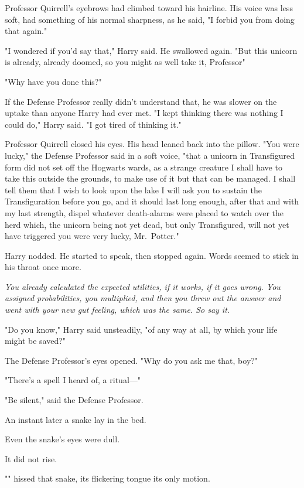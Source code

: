 Professor Quirrell's eyebrows had climbed toward his hairline. His voice was
less soft, had something of his normal sharpness, as he said, "I forbid you
from doing that again."

"I wondered if you'd say that," Harry said. He swallowed again. "But this
unicorn is already, already doomed, so you might as well take it,
Professor{\el}"

"Why have you done this?"

If the Defense Professor really didn't understand that, he was slower on the
uptake than anyone Harry had ever met. "I kept thinking there was nothing I
could do," Harry said. "I got tired of thinking it."

Professor Quirrell closed his eyes. His head leaned back into the pillow. "You
were lucky," the Defense Professor said in a soft voice, "that a unicorn in
Transfigured form{\el} did not set off the Hogwarts wards, as a strange
creature{\el} I shall have to{\el} take this outside the grounds, to make
use of it{\el} but that can be managed. I shall tell them that I wish to
look upon the lake{\el} I will ask you to sustain the Transfiguration before
you go, and it should last long enough, after that{\el} and with my last
strength, dispel whatever death-alarms were placed to watch over the
herd{\el} which, the unicorn being not yet dead, but only Transfigured, will
not yet have triggered{\el} you were very lucky, Mr.~Potter."

Harry nodded. He started to speak, then stopped again. Words seemed to stick in
his throat once more.

\emph{You already calculated the expected utilities, if it works, if it goes
wrong. You assigned probabilities, you multiplied, and then you threw out the
answer and went with your new gut feeling, which was the same. So say it.}

"Do you know," Harry said unsteadily, "of any way at all, by which your life
might be saved?"

The Defense Professor's eyes opened. "Why{\el} do you ask me that, boy?"

"There's{\el} a spell I heard of, a ritual\mbox{---}"

"Be silent," said the Defense Professor.

An instant later a snake lay in the bed.

Even the snake's eyes were dull.

It did not rise.

"" hissed that snake, its flickering tongue its only motion.


